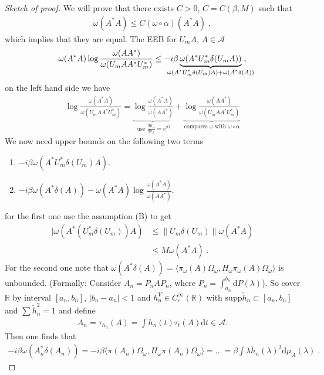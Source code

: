 \documentclass[
a4paper, %
11pt, %
onecolumn, %
openany, %
]{memoir}
\theoremstyle{definition}
\theoremstyle{remark}
\theoremstyle{plain}
\begin{document}
\begin{proof}[Sketch of proof]
We will prove that there exists $C>0$, $C=C(\beta, M)$ such that \begin{align}
\omega(A^*A)\leq C(\omega\circ\alpha)(A^*A)\; ,
\end{align}
which implies that they are equal. The EEB for $U_mA$, $A\in\mathcal{A}$ \begin{align}
\omega(A^*A)\log\frac{\omega(AA^*)}{\omega(U_m A A^* U_m^*)}\leq -i\beta \underbrace{\omega(A^*U_m^*\delta(U_m A))}_{\mathclap{\omega(A^*U_m^*\delta(U_m)A)+\omega(A^*\delta(A))}}\; , \label{eqn::thm41proof}
\end{align}
on the left hand side we have \begin{align}
\log\frac{\omega(A^*A)}{\omega(U_mAA^*U_m^*)}=\underbrace{\log\frac{\omega(A^*A)}{\omega(AA^*)}}_{\text{ use } \frac{\mathrm{d}\mu_A}{\mathrm{d}v_A}=e^{\beta\lambda}}+\underbrace{\log \frac{\omega(AA^*)}{\omega(U_mAA^*U_m^*)}}_{\text{compares $\omega$ with $\omega\circ\alpha$}}
\end{align}
We now need upper bounds on the following two terms \begin{enumerate}
\item $-i\beta\omega(A^*U_m^*\delta(U_m)A)$.
\item $-i\beta\omega(A^*\delta(A))-\omega(A^*A)\log \frac{\omega(A^*A)}{\omega(AA^*)}$.
\end{enumerate}
for the first one use the assumption (B) to get \begin{align}
|\omega(A^*(U_m^*\delta(U_m))A)&\leq \| U_m\delta(U_m)\| \omega(A^*A)\\
&\leq M\omega(A^*A)\; .
\end{align}
For the second one note that $\omega(A^*\delta(A))=\langle\pi_{\omega}(A)\Omega_{\omega},H_{\omega}\pi_{\omega}(A)\Omega_{\omega}\rangle$ is unbounded. (Formally: Consider $A_n=P_nAP_n$, where $P_n=\int_{a_n}^{b_n}\mathrm{d}P(\lambda)$). So cover $\mathbb{R}$ by interval $[a_n,b_n]$, $|b_n-a_n|<1$ and $h_n^V\in C_c^{\infty}(\mathbb{R})$ with $\mathrm{supp}\check{h}_n\subset[a_n,b_n]$ and $\sum \check{h}_n^2=1$ and define \begin{align}
A_n=\tau_{h_n}(A)=\int h_n(t)\tau_t(A)\mathrm{d}t\in\mathcal{A}.
\end{align}
Then one finds that \begin{align}
-i\beta\omega(A_n^*\delta(A_n))=-i\beta\langle\pi(A_n)\Omega_{\omega},H_{\omega}\pi(A_n)\Omega_{\omega}\rangle=\ldots = \beta \int\lambda \check{h}_n(\lambda)^2\mathrm{d}\mu_A(\lambda)\;.

\end{align}
\end{proof}
\end{document}
